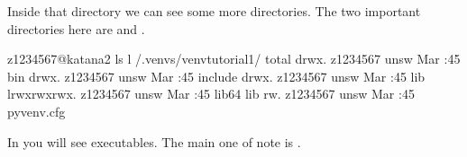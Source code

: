 \documentclass[letterpaper,10pt,english]{sphinxmanual}
\begin{document}
Inside that directory we can see some more directories. The two important directories here are  and .

\begin{sphinxVerbatim}[commandchars=\\\{\}]
\PYG{o}{[}z1234567@katana2 \PYGZti{}\PYG{o}{]}\PYGZdl{} ls \PYGZhy{}l \PYGZti{}/.venvs/venv\PYGZhy{}tutorial\PYGZhy{}1/
total 
drwx\PYGZhy{}\PYGZhy{}\PYGZhy{}\PYGZhy{}\PYGZhy{}\PYGZhy{}.  z1234567 unsw  Mar  :45 bin
drwx\PYGZhy{}\PYGZhy{}\PYGZhy{}\PYGZhy{}\PYGZhy{}\PYGZhy{}.  z1234567 unsw     Mar  :45 include
drwx\PYGZhy{}\PYGZhy{}\PYGZhy{}\PYGZhy{}\PYGZhy{}\PYGZhy{}.  z1234567 unsw    Mar  :45 lib
lrwxrwxrwx.  z1234567 unsw     Mar  :45 lib64 \PYGZhy{}\PYGZgt{} lib
\PYGZhy{}rw\PYGZhy{}\PYGZhy{}\PYGZhy{}\PYGZhy{}\PYGZhy{}\PYGZhy{}\PYGZhy{}.  z1234567 unsw    Mar  :45 pyvenv.cfg
\end{sphinxVerbatim}

In  you will see executables. The main one of note is .
\end{document}
